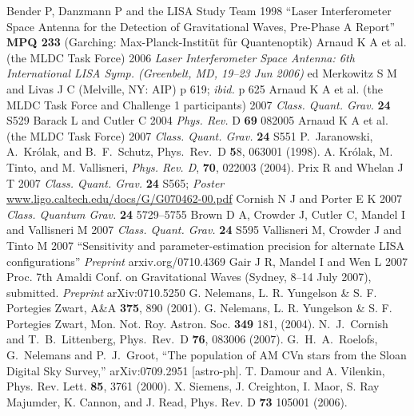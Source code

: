 \documentclass{iopart}
\begin{document}
\begin{thebibliography}{99}
%
 Bender P, Danzmann P and the LISA Study Team 1998 ``Laser Interferometer Space Antenna for the Detection of Gravitational Waves, Pre-Phase A Report'' \textbf{MPQ 233} (Garching: Max-Planck-Instit\"ut f\"ur Quantenoptik) 
%
 Arnaud K A et al. (the MLDC Task Force) 2006 \textit{Laser Interferometer Space Antenna: 6th International LISA Symp. (Greenbelt, MD, 19--23 Jun 2006)} ed Merkowitz S M and Livas J C (Melville, NY: AIP) p 619; \textit{ibid.} p 625
%
 Arnaud K A et al. (the MLDC Task Force and Challenge 1 participants) 2007 \textit{Class. Quant. Grav.} \textbf{24} S529
%
 Barack L and Cutler C 2004 \textit{Phys. Rev.} D \textbf{69} 082005
%
 Arnaud K A et al. (the MLDC Task Force) 2007 \textit{Class. Quant. Grav.} \textbf{24} S551
%
P.\ Jaranowski, A.\ Kr\'olak, and B.\ F.\ Schutz, Phys.\ Rev.\ D
{\textbf 58}, 063001 (1998).
%
 A. Kr\'olak, M. Tinto, and M. Vallisneri, {\it Phys. Rev. D}, {\bf 70},
022003 (2004).
%
 Prix R and Whelan J T 2007 \textit{Class. Quant. Grav.} \textbf{24} S565; \textit{Poster} \url{www.ligo.caltech.edu/docs/G/G070462-00.pdf}
%
 Cornish N J and Porter E K 2007 \textit{Class. Quantum Grav.} \textbf{24} 5729--5755
%
 Brown D A, Crowder J, Cutler C, Mandel I and Vallisneri M 2007 \textit{Class. Quant. Grav.} \textbf{24} S595
%
 Vallisneri M, Crowder J and Tinto M 2007 ``Sensitivity and parameter-estimation precision for alternate LISA configurations'' \textit{Preprint} arxiv.org/0710.4369 
%
 Gair J R, Mandel I and Wen L 2007 Proc. 7th Amaldi Conf. on Gravitational Waves (Sydney, 8--14 July 2007), submitted. \textit{Preprint} arXiv:0710.5250
%
 G. Nelemans, L. R. Yungelson \& S. F. Portegies Zwart, A\&A {\bf 375}, 890 (2001).
%
 G. Nelemans, L. R. Yungelson \& S. F. Portegies Zwart, Mon. Not. Roy. Astron. Soc.
{\bf 349} 181, (2004).
%
 N.~J.~Cornish and T.~B.~Littenberg, Phys.\ Rev.\ D {\bf 76}, 083006 (2007).
%
 G.~H.~A.~Roelofs, G.~Nelemans and P.~J.~Groot,
``The population of AM CVn stars from the Sloan Digital Sky Survey,''
arXiv:0709.2951 [astro-ph].
%
 T. Damour and A. Vilenkin, Phys. Rev. Lett. {\bf 85}, 3761 (2000).
%
 X. Siemens, J. Creighton, I. Maor, S. Ray Majumder,
K. Cannon, and J. Read, Phys. Rev. D {\bf 73} 105001 (2006).

\end{thebibliography}
\end{document}
